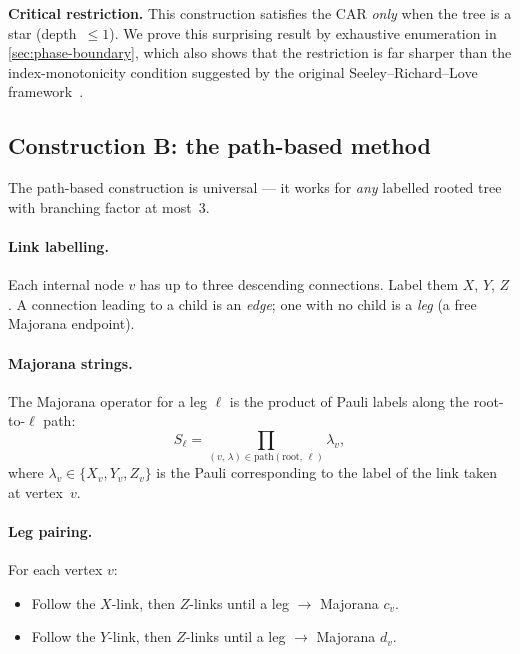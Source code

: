 \textbf{Critical restriction.}  This construction satisfies the CAR
\emph{only} when the tree is a star (depth~$\le 1$).  We prove this
surprising result by exhaustive enumeration in
\cref{sec:phase-boundary}, which also shows that the restriction is
far sharper than the index-monotonicity condition suggested by the
original Seeley--Richard--Love framework~\cite{seeley2012}.

\subsection{Construction B: the path-based method}
\label{sec:te-pathbased}

The path-based construction \cite{jiang2020,miller2023bonsai} is
universal — it works for \emph{any} labelled rooted tree with branching
factor at most~3.

\paragraph{Link labelling.}
Each internal node $v$ has up to three descending connections.  Label
them $X$, $Y$, $Z$.  A connection leading to a child is an
\emph{edge}; one with no child is a \emph{leg} (a free Majorana
endpoint).

\paragraph{Majorana strings.}
The Majorana operator for a leg $\ell$ is the product of Pauli labels
along the root-to-$\ell$ path:
%
\begin{equation}
  S_\ell = \prod_{(v,\,\lambda) \in \mathrm{path}(\text{root},\,\ell)}
           \lambda_v,
  \label{eq:majorana-path}
\end{equation}
%
where $\lambda_v \in \{X_v, Y_v, Z_v\}$ is the Pauli corresponding to
the label of the link taken at vertex~$v$.

\paragraph{Leg pairing.}
For each vertex $v$:
\begin{itemize}
  \item Follow the $X$-link, then $Z$-links until a leg
        $\to$ Majorana $c_v$.
  \item Follow the $Y$-link, then $Z$-links until a leg
        $\to$ Majorana $d_v$.
\end{itemize}

